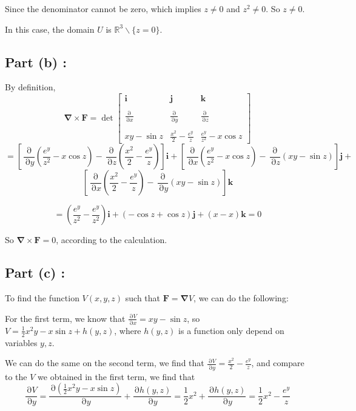\documentclass[12pt]{article}
\renewcommand{\vec}[1]{\boldsymbol{#1}}
\DeclareMathOperator{\pt}{\partial}
\begin{document}
Since the denominator cannot be zero, which implies
$ z \neq 0$ and $z^2 \neq 0$. So $z \neq 0$.

In this case, the domain $U$ is $\mathbb{R}^3 \backslash
\lbrace z = 0 \rbrace $.

\subsection*{Part (b) :}
By definition, 
\[ \vec{\nabla} \times \vec F = \displaystyle{
    \det
\begin{bmatrix}
    \vec i & \vec j & \vec k \\
     & & \\
    \displaystyle{\frac{\pt}{\pt x}} & \displaystyle{\frac{\pt}{\pt y}} & \displaystyle{\frac{\pt}{\pt z}} \\
     & & \\
    xy - \sin z & \displaystyle{\frac{x^2}{2} - \frac{e^y}{z} }& \displaystyle{\frac{e^y}{z^2} - x\cos z}
\end{bmatrix} } \]
\[ = \left[\frac{\pt}{\pt y}\left( \frac{e^y}{z^2} -x\cos z
\right) - \frac{\pt}{\pt z}\left( \frac{x^2}{2} -
\frac{e^y}{z}\right) \right] \vec i 
+ \left[ \frac{\pt}{\pt x}\left( \frac{e^y}{z^2} -x\cos z
\right) - \frac{\pt}{\pt z}\left( xy -
\sin z\right)\right] \vec j + \]
\[ \left[
\frac{\pt}{\pt x}\left( \frac{x^2}{2} - \frac{e^y}{z}
\right) - \frac{\pt}{\pt y}\left( xy - \sin z\right)
\right] \vec k \]

\[ = \left( \frac{e^y}{z^2} - \frac{e^y}{z^2} \right)
\vec i + \left( -\cos z + \cos z \right) \vec j +
\left( x - x \right) \vec k = 0\]

So $\vec{\nabla} \times \vec{F} = 0$, according to 
the calculation.

\subsection*{Part (c) :}

To find the function $V(x,y,z)$ such that $\vec{F}
= \vec{\nabla} V$, we can do the following:


For the first term, we know that $\displaystyle{
    \frac{\pt V}{\pt x} = xy - \sin z
}$, so $V = \displaystyle{\frac{1}{2}x^2y - x\sin z
+ h(y,z)}$, where $h(y,z)$ is a function only 
depend on variables $y,z$.

We can do the same on the second term, we find that
$\displaystyle{\frac{\pt V}{\pt y} = 
\frac{x^2}{2} - \frac{e^y}{z}}$, and compare to the 
$V$ we obtained in the first term, we find that
\[ \frac{\pt V}{\pt y} = \frac{\pt
\left(\frac{1}{2}x^2 y - x\sin z\right)}{\pt y} +
\frac{\pt h(y,z)}{\pt y} = \frac{1}{2}x^2 + 
\frac{\pt h(y,z)}{\pt y} = \frac{1}{2}x^2 - 
\frac{e^y}{z}\]
\end{document}
